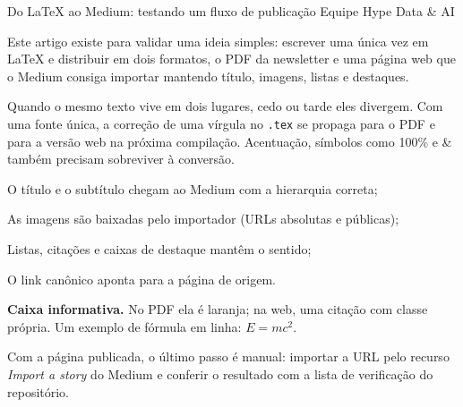 
\hypearticle
{Do LaTeX ao Medium: testando um fluxo de publicação}
{Equipe Hype Data \& AI}
{

\hspace*{1.5em} Este artigo existe para validar uma ideia simples: escrever uma única vez em
\LaTeX{} e distribuir em dois formatos, o PDF da newsletter e uma página web que o Medium
consiga importar mantendo título, imagens, listas e destaques.

\subtitle{Por que uma fonte única?}

Quando o mesmo texto vive em dois lugares, cedo ou tarde eles divergem. Com uma fonte única,
a correção de uma vírgula no \texttt{.tex} se propaga para o PDF e para a versão web na
próxima compilação. Acentuação, símbolos como 100\% e \& também precisam sobreviver à
conversão.


\subtitle{O que queremos verificar}

\begin{hypeitemize}
  \item O título e o subtítulo chegam ao Medium com a hierarquia correta;
  \item As imagens são baixadas pelo importador (URLs absolutas e públicas);
  \item Listas, citações e caixas de destaque mantêm o sentido;
  \item O link canônico aponta para a página de origem.
\end{hypeitemize}


\begin{infobox}
\textbf{Caixa informativa.} No PDF ela é laranja; na web, uma citação com classe própria.
Um exemplo de fórmula em linha: $E = mc^2$.
\end{infobox}

\subtitle{Próximo passo}

Com a página publicada, o último passo é manual: importar a URL pelo recurso
\emph{Import a story} do Medium e conferir o resultado com a lista de verificação do
repositório.


}
